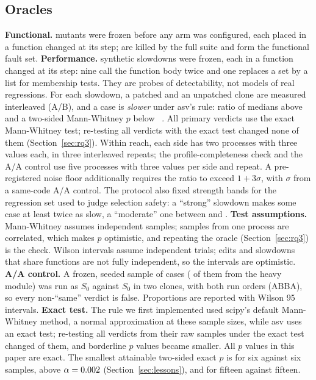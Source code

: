 \subsection{Oracles}
\textbf{Functional.} \MutantsFrozen{} mutants were frozen before any arm was configured, each placed in a function changed at its step; \MutantsKilled{} are killed by the full suite and form the functional fault set.
\textbf{Performance.} \NumSlowdowns{} synthetic slowdowns were frozen, each in a function changed at its step: nine call the function body twice and one replaces a set by a list for membership tests.
They are probes of detectability, not models of real regressions.
For each slowdown, a patched and an unpatched clone are measured interleaved (A/B), and a case is \emph{slower} under asv's rule: ratio of medians above \AsvFactor{} and a two-sided Mann-Whitney $p$ below \AsvAlpha~\cite{asvcommands}.
All primary verdicts use the exact Mann-Whitney test; re-testing all \RecomputeVerdicts{} verdicts with the exact test changed none of them (Section~\ref{sec:rq3}).
Within reach, each side has two processes with three values each, in three interleaved repeats; the profile-completeness check and the A/A control use five processes with three values per side and repeat.
A pre-registered noise floor additionally requires the ratio to exceed $1+3\sigma$, with $\sigma$ from a same-code A/A control.
The protocol also fixed strength bands for the regression set used to judge selection safety: a ``strong'' slowdown makes some case at least twice as slow, a ``moderate'' one between \BandModLo{} and \BandModHi\x.
\textbf{Test assumptions.} Mann-Whitney assumes independent samples; samples from one process are correlated, which makes $p$ optimistic, and repeating the oracle (Section~\ref{sec:rq3}) is the check. Wilson intervals assume independent trials; edits and slowdowns that share functions are not fully independent, so the intervals are optimistic.
\textbf{A/A control.} A frozen, seeded sample of \AACases{} cases (\AAAlgoCases{} of them from the heavy module) was run as $S_0$ against $S_0$ in two clones, with both run orders (ABBA), so every non-``same'' verdict is false.
Proportions are reported with Wilson 95\pct{} intervals.
\textbf{Exact test.} The rule we first implemented used scipy's default Mann-Whitney method, a normal approximation at these sample sizes, while asv uses an exact test; re-testing all \RecomputeVerdicts{} verdicts from their raw samples under the exact test changed \RecomputeChanged{} of them, and borderline $p$ values became smaller. All $p$ values in this paper are exact.
The smallest attainable two-sided exact $p$ is \MinPSixSix{} for six against six samples, above $\alpha=0.002$ (Section~\ref{sec:lessons}), and \MinPFifteen{} for fifteen against fifteen.

